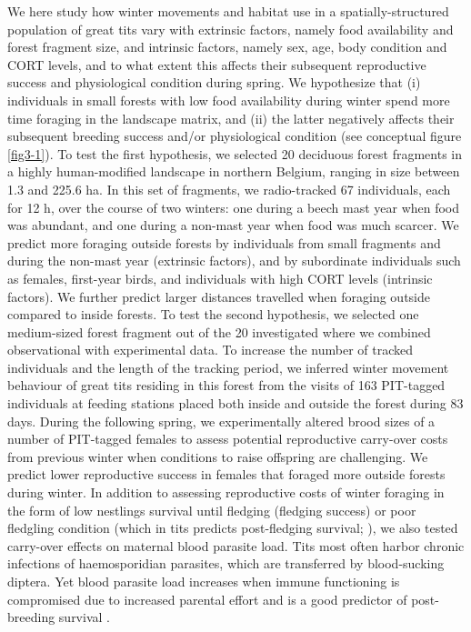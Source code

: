\documentclass[10pt, twoside]{book} %
\begin{document}
We here study how winter movements and habitat use in a spatially-structured population of great tits vary with extrinsic factors, namely food availability and forest fragment size, and intrinsic factors, namely sex, age, body condition and CORT levels, and to what extent this affects their subsequent reproductive success and physiological condition during spring. We hypothesize that (i) individuals in small forests with low food availability during winter spend more time foraging in the landscape matrix, and (ii) the latter negatively affects their subsequent breeding success and/or physiological condition (see conceptual figure \ref{fig3-1}). To test the first hypothesis, we selected 20 deciduous forest fragments in a highly human-modified landscape in northern Belgium, ranging in size between 1.3 and 225.6 ha. In this set of fragments, we radio-tracked 67 individuals, each for 12 h, over the course of two winters: one during a beech mast year when food was abundant, and one during a non-mast year when food was much scarcer. We predict more foraging outside forests by individuals from small fragments and during the non-mast year (extrinsic factors), and by subordinate individuals such as females, first-year birds, and individuals with high CORT levels (intrinsic factors). We further predict larger distances travelled when foraging outside compared to inside forests. To test the second hypothesis, we selected one medium-sized forest fragment out of the 20 investigated where we combined observational with experimental data. To increase the number of tracked individuals and the length of the tracking period, we inferred winter movement behaviour of great tits residing in this forest from the visits of 163 PIT-tagged individuals at feeding stations placed both inside and outside the forest during 83 days. During the following spring, we experimentally altered brood sizes of a number of PIT-tagged females to assess potential reproductive carry-over costs from previous winter when conditions to raise offspring are challenging. We predict lower reproductive success in females that foraged more outside forests during winter. In addition to assessing reproductive costs of winter foraging in the form of low nestlings survival until fledging (fledging success) or poor fledgling condition (which in tits predicts post-fledging survival; \citealt{Perrins1965, Monros2002}), we also tested carry-over effects on maternal blood parasite load. Tits most often harbor chronic infections of haemosporidian parasites, which are transferred by blood-sucking diptera. Yet blood parasite load increases when immune functioning is compromised due to increased parental effort and is a good predictor of post-breeding survival \citep{Christe2012, Puente2010}.\\
\end{document}
